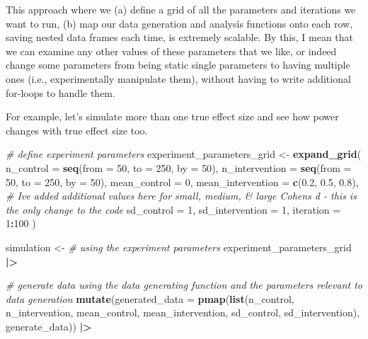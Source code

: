 \documentclass[
]{article}
\newenvironment{Shaded}{\begin{snugshade}}{\end{snugshade}}
\newcommand{\AttributeTok}[1]{\textcolor[rgb]{0.13,0.29,0.53}{#1}}
\newcommand{\CommentTok}[1]{\textcolor[rgb]{0.56,0.35,0.01}{\textit{#1}}}
\newcommand{\DecValTok}[1]{\textcolor[rgb]{0.00,0.00,0.81}{#1}}
\newcommand{\FloatTok}[1]{\textcolor[rgb]{0.00,0.00,0.81}{#1}}
\newcommand{\FunctionTok}[1]{\textcolor[rgb]{0.13,0.29,0.53}{\textbf{#1}}}
\newcommand{\NormalTok}[1]{#1}
\newcommand{\OtherTok}[1]{\textcolor[rgb]{0.56,0.35,0.01}{#1}}
\newcommand{\SpecialCharTok}[1]{\textcolor[rgb]{0.81,0.36,0.00}{\textbf{#1}}}
\begin{document}
This approach where we (a) define a grid of all the parameters and
iterations we want to run, (b) map our data generation and analysis
functions onto each row, saving nested data frames each time, is
extremely scalable. By this, I mean that we can examine any other values
of these parameters that we like, or indeed change some parameters from
being static single parameters to having multiple ones (i.e.,
experimentally manipulate them), without having to write additional
for-loops to handle them.

For example, let's simulate more than one true effect size and see how
power changes with true effect size too.

\begin{Shaded}
\begin{Highlighting}[]
\CommentTok{\# define experiment parameters}
\NormalTok{experiment\_parameters\_grid }\OtherTok{\textless{}{-}} \FunctionTok{expand\_grid}\NormalTok{(}
  \AttributeTok{n\_control =} \FunctionTok{seq}\NormalTok{(}\AttributeTok{from =} \DecValTok{50}\NormalTok{, }\AttributeTok{to =} \DecValTok{250}\NormalTok{, }\AttributeTok{by =} \DecValTok{50}\NormalTok{),}
  \AttributeTok{n\_intervention =} \FunctionTok{seq}\NormalTok{(}\AttributeTok{from =} \DecValTok{50}\NormalTok{, }\AttributeTok{to =} \DecValTok{250}\NormalTok{, }\AttributeTok{by =} \DecValTok{50}\NormalTok{),}
  \AttributeTok{mean\_control =} \DecValTok{0}\NormalTok{,}
  \AttributeTok{mean\_intervention =} \FunctionTok{c}\NormalTok{(}\FloatTok{0.2}\NormalTok{, }\FloatTok{0.5}\NormalTok{, }\FloatTok{0.8}\NormalTok{), }\CommentTok{\# I\textquotesingle{}ve added additional values here for small, medium, \& large Cohen\textquotesingle{}s d  {-} this is the only change to the code}
  \AttributeTok{sd\_control =} \DecValTok{1}\NormalTok{,}
  \AttributeTok{sd\_intervention =} \DecValTok{1}\NormalTok{,}
  \AttributeTok{iteration =} \DecValTok{1}\SpecialCharTok{:}\DecValTok{100} 
\NormalTok{)}

\NormalTok{simulation }\OtherTok{\textless{}{-}} 
  \CommentTok{\# using the experiment parameters}
\NormalTok{  experiment\_parameters\_grid }\SpecialCharTok{|\textgreater{}}
  
  \CommentTok{\# generate data using the data generating function and the parameters relevant to data generation}
  \FunctionTok{mutate}\NormalTok{(}\AttributeTok{generated\_data =} \FunctionTok{pmap}\NormalTok{(}\FunctionTok{list}\NormalTok{(n\_control,}
\NormalTok{                                    n\_intervention,}
\NormalTok{                                    mean\_control,}
\NormalTok{                                    mean\_intervention,}
\NormalTok{                                    sd\_control,}
\NormalTok{                                    sd\_intervention),}
\NormalTok{                               generate\_data)) }\SpecialCharTok{|\textgreater{}}
  

\end{Highlighting}
\end{Shaded}
\end{document}
